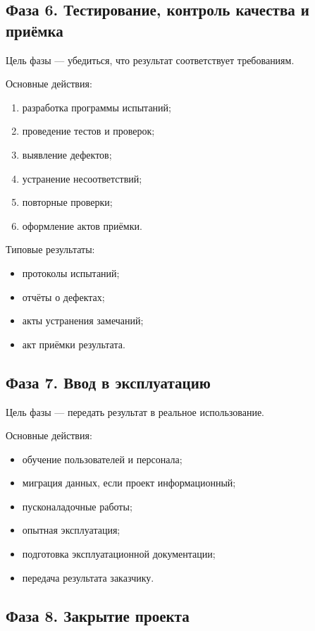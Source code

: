 \documentclass[12pt,a4paper]{article}
\begin{document}
\subsection{Фаза 6. Тестирование, контроль качества и приёмка}

Цель фазы --- убедиться, что результат соответствует требованиям.

Основные действия:
\begin{enumerate}
    \item разработка программы испытаний;
    \item проведение тестов и проверок;
    \item выявление дефектов;
    \item устранение несоответствий;
    \item повторные проверки;
    \item оформление актов приёмки.
\end{enumerate}

Типовые результаты:
\begin{itemize}
    \item протоколы испытаний;
    \item отчёты о дефектах;
    \item акты устранения замечаний;
    \item акт приёмки результата.
\end{itemize}

\subsection{Фаза 7. Ввод в эксплуатацию}

Цель фазы --- передать результат в реальное использование.

Основные действия:
\begin{itemize}
    \item обучение пользователей и персонала;
    \item миграция данных, если проект информационный;
    \item пусконаладочные работы;
    \item опытная эксплуатация;
    \item подготовка эксплуатационной документации;
    \item передача результата заказчику.
\end{itemize}

\subsection{Фаза 8. Закрытие проекта}
\end{document}
